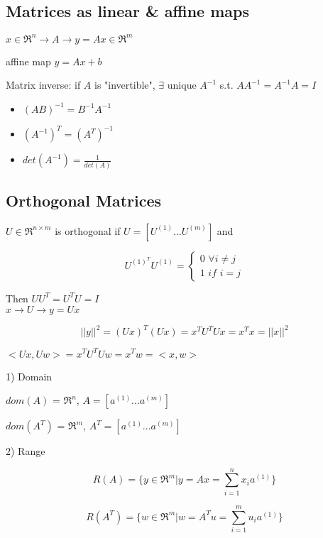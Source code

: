\subsection{Matrices as linear \& affine maps}


$x\in \Re^n \rightarrow A \rightarrow y = Ax \in \Re^m$

affine map $y = Ax + b$

Matrix inverse: if $A$ is "invertible", $\exists$ unique $A^{-1}$ s.t. $AA^{-1} = A^{-1}A = I$

\begin{itemize}
	\item $(AB)^{-1} = B^{-1}A^{-1}$
	
	\item $(A^{-1})^T = (A^T)^{-1}$
	
	\item $det(A^{-1}) = \frac{1}{det(A)}$
\end{itemize}

\subsection{Orthogonal Matrices}

$U\in \Re^{n\times m}$ is orthogonal if $U = [U^{(1)} ... U^{(m)}]$
and 

$$ U^{(1)^T}U^{(1)}=\left\{
\begin{aligned}
0\,\, \forall i\neq j \\
1\,\, if \,\, i = j 
\end{aligned}
\right.
$$

Then $UU^T = U^TU = I$\\


$x\rightarrow U \rightarrow y = Ux$

\begin{equation*}
||y||^2 = (Ux)^T(Ux) = x^TU^TUx = x^Tx = ||x||^2
\end{equation*}

$<Ux, Uw> = x^TU^TUw = x^Tw = <x, w>$

1) Domain

$dom(A)$ = $\Re^n$, $A = [a^{(1)}...a^{(m)}]$

$dom(A^T)$ = $\Re^m$, $A^T = [a^{(1)}...a^{(m)}]$


2) Range

\begin{equation*}
R(A) = \{y\in \Re^m | y = Ax = \sum^n_{i=1}x_ia^{(1)}\}
\end{equation*}

\begin{equation*}
R(A^T) = \{w\in \Re^m | w = A^Tu = \sum^m_{i=1}u_ia^{(1)}\}
\end{equation*}

